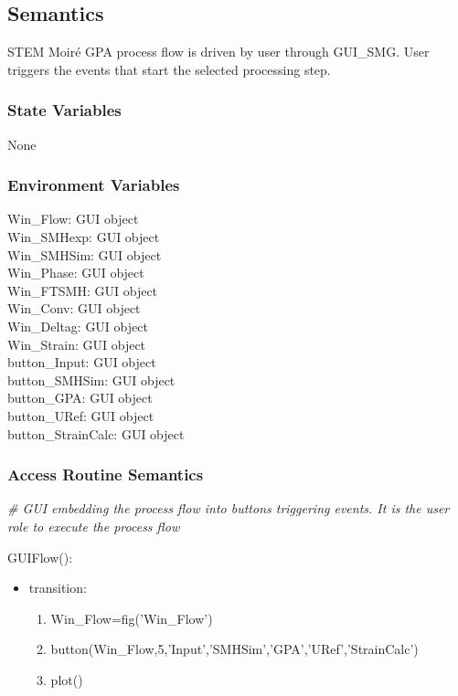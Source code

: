 \documentclass[12pt, titlepage]{article}
\newcommand{\progname}{STEM Moir{\'e} GPA}
\begin{document}
\subsection{Semantics}

\progname{} process flow is driven by user through GUI{\_}SMG. User triggers the events that start the selected processing step. 

\subsubsection{State Variables}
None

\subsubsection{Environment Variables}

\noindent Win{\_}Flow: GUI object\\
Win{\_}SMHexp: GUI object\\
Win{\_}SMHSim: GUI object\\
Win{\_}Phase: GUI object\\
Win{\_}FTSMH: GUI object\\
Win{\_}Conv: GUI object\\
Win{\_}Deltag: GUI object\\
Win{\_}Strain: GUI object\\
button{\_}Input: GUI object\\
button{\_}SMHSim: GUI object\\
button{\_}GPA: GUI object\\
button{\_}URef: GUI object\\
button{\_}StrainCalc: GUI object\\


\subsubsection{Access Routine Semantics}

\noindent\textit{{\#} GUI embedding the process flow into buttons triggering events. It is the user role to execute the process flow}\medskip

\noindent GUIFlow():
\begin{itemize}
\item transition: 
	\begin{enumerate}
	\item Win{\_}Flow=fig('Win{\_}Flow') 
	\item button(Win{\_}Flow,5,'Input','SMHSim','GPA','URef','StrainCalc') 
	\item plot()
	\end{enumerate} 
\end{itemize}
\bigskip
\end{document}
